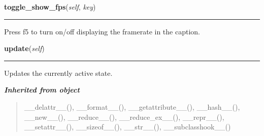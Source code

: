     \label{pygame-asteroids:tools:Control:toggle_show_fps}

    \vspace{0.5ex}

\hspace{.8\funcindent}\begin{boxedminipage}{\funcwidth}

    \raggedright \textbf{toggle\_show\_fps}(\textit{self}, \textit{key})

    \vspace{-1.5ex}

    \rule{\textwidth}{0.5\fboxrule}
\setlength{\parskip}{2ex}
    Press f5 to turn on/off displaying the framerate in the caption.

\setlength{\parskip}{1ex}
    \end{boxedminipage}

    \label{pygame-asteroids:tools:Control:update}

    \vspace{0.5ex}

\hspace{.8\funcindent}\begin{boxedminipage}{\funcwidth}

    \raggedright \textbf{update}(\textit{self})

    \vspace{-1.5ex}

    \rule{\textwidth}{0.5\fboxrule}
\setlength{\parskip}{2ex}
    Updates the currently active state.

\setlength{\parskip}{1ex}
    \end{boxedminipage}


\large{\textbf{\textit{Inherited from object}}}

\begin{quote}
\_\_delattr\_\_(), \_\_format\_\_(), \_\_getattribute\_\_(), \_\_hash\_\_(), \_\_new\_\_(), \_\_reduce\_\_(), \_\_reduce\_ex\_\_(), \_\_repr\_\_(), \_\_setattr\_\_(), \_\_sizeof\_\_(), \_\_str\_\_(), \_\_subclasshook\_\_()
\end{quote}


